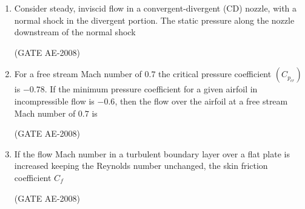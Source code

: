 \documentclass[journal,12pt,onecolumn]{IEEEtran}
\theoremstyle{remark}
\begin{document}
\begin{enumerate}
\item Consider steady, inviscid flow in a convergent-divergent (CD) nozzle, with a normal shock in the divergent portion. The static pressure along the nozzle downstream of the normal shock  
\begin{enumerate}
\end{enumerate}
    \hfill(GATE AE-2008)

    \quad

\item For a free stream Mach number of $0.7$ the critical pressure coefficient $(C_{p_{cr}})$ is $-0.78$. If the minimum pressure coefficient for a given airfoil in incompressible flow is $-0.6$, then the flow over the airfoil at a free stream Mach number of $0.7$ is  
\begin{enumerate}
\end{enumerate}
  \hfill(GATE AE-2008)

    \quad

\item If the flow Mach number in a turbulent boundary layer over a flat plate is increased keeping the Reynolds number unchanged, the skin friction coefficient $C_f$  
\begin{enumerate}
\end{enumerate}
 \hfill(GATE AE-2008)


\end{enumerate}
\end{document}
